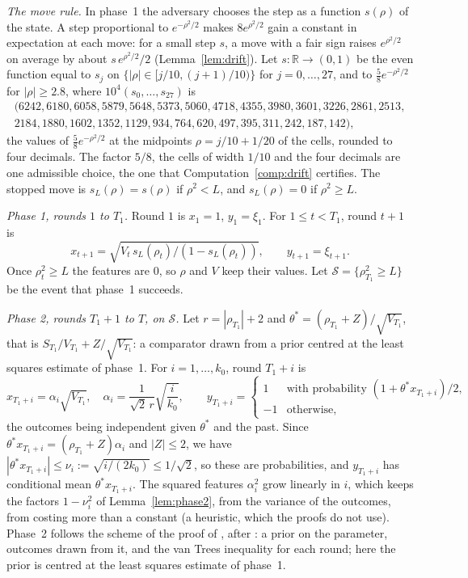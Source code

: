 \documentclass[12pt]{amsart}
\theoremstyle{definition}
\numberwithin{equation}{section}
\newcommand{\R}{\mathbb{R}}
\newcommand{\Succ}{\mathcal{S}}
\begin{document}
\emph{The move rule.} In phase~1 the adversary chooses the step as a function $s(\rho)$ of the state. A step proportional to $e^{-\rho^2/2}$ makes $8e^{\rho^2/2}$ gain a constant in expectation at each move: for a small step $s$, a move with a fair sign raises $e^{\rho^2/2}$ on average by about $s\,e^{\rho^2/2}/2$ (Lemma~\ref{lem:drift}). Let $s\colon\R\to(0,1)$ be the even function equal to $s_j$ on $\{|\rho|\in[j/10,(j+1)/10)\}$ for $j=0,\dots,27$, and to $\frac58e^{-\rho^2/2}$ for $|\rho|\ge2.8$, where $10^4(s_0,\dots,s_{27})$ is
\[
\begin{gathered}
(6242,6180,6058,5879,5648,5373,5060,4718,4355,3980,3601,3226,2861,2513,\\
2184,1880,1602,1352,1129,934,764,620,497,395,311,242,187,142),
\end{gathered}
\]
the values of $\frac58e^{-\rho^2/2}$ at the midpoints $\rho=j/10+1/20$ of the cells, rounded to four decimals. The factor $5/8$, the cells of width $1/10$ and the four decimals are one admissible choice, the one that Computation~\ref{comp:drift} certifies. The stopped move is $s_L(\rho)=s(\rho)$ if $\rho^2<L$, and $s_L(\rho)=0$ if $\rho^2\ge L$.

\emph{Phase 1, rounds $1$ to $T_1$.} Round $1$ is $x_1=1$, $y_1=\xi_1$. For $1\le t<T_1$, round $t+1$ is
\[
x_{t+1}=\sqrt{V_t\,s_L(\rho_t)/(1-s_L(\rho_t))},\qquad y_{t+1}=\xi_{t+1}.
\]
Once $\rho_t^2\ge L$ the features are $0$, so $\rho$ and $V$ keep their values. Let $\Succ=\{\rho_{T_1}^2\ge L\}$ be the event that phase~1 succeeds.

\emph{Phase 2, rounds $T_1+1$ to $T$, on $\Succ$.} Let $r=|\rho_{T_1}|+2$ and $\theta^*=(\rho_{T_1}+Z)/\sqrt{V_{T_1}}$, that is $S_{T_1}/V_{T_1}+Z/\sqrt{V_{T_1}}$: a comparator drawn from a prior centred at the least squares estimate of phase~1. For $i=1,\dots,k_0$, round $T_1+i$ is
\[
x_{T_1+i}=\alpha_i\sqrt{V_{T_1}},\quad\alpha_i=\frac1{\sqrt2\,r}\sqrt{\frac i{k_0}},\qquad y_{T_1+i}=\begin{cases}1&\text{with probability }(1+\theta^*x_{T_1+i})/2,\\-1&\text{otherwise,}\end{cases}
\]
the outcomes being independent given $\theta^*$ and the past. Since $\theta^*x_{T_1+i}=(\rho_{T_1}+Z)\alpha_i$ and $|Z|\le2$, we have $|\theta^*x_{T_1+i}|\le\nu_i:=\sqrt{i/(2k_0)}\le1/\sqrt2$, so these are probabilities, and $y_{T_1+i}$ has conditional mean $\theta^*x_{T_1+i}$. The squared features $\alpha_i^2$ grow linearly in $i$, which keeps the factors $1-\nu_i^2$ of Lemma~\ref{lem:phase2}, from the variance of the outcomes, from costing more than a constant (a heuristic, which the proofs do not use).
Phase~2 follows the scheme of the proof of \citet[Theorem~4]{GaillardALT19}, after \citet[Theorem~2]{Vovk01}: a prior on the parameter, outcomes drawn from it, and the van Trees inequality for each round; here the prior is centred at the least squares estimate of phase~1.
\end{document}
